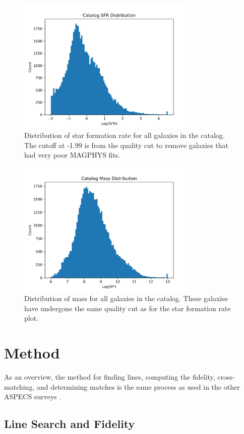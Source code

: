 \begin{figure}[!tbp]
\centering \includegraphics[width=87mm]{Survey/MAGPHYS_SFR.png}
\caption{Distribution of star formation rate for all galaxies in the catalog. The cutoff at -1.99 is from the quality cut to remove galaxies that had very poor MAGPHYS fits.}
\label{fig:MAGPHYS_SFR}
\end{figure}

\begin{figure}[!tbp]
\centering \includegraphics[width=87mm]{Survey/MAGPHYS_Mstar.png}
\caption{Distribution of mass for all galaxies in the catalog. These galaxies have undergone the same quality cut as for the star formation rate plot.}
\label{fig:MAGPHYS_Mstar}
\end{figure}

\section{Method}

As an overview, the method for finding lines, computing the fidelity, cross-matching, and determining matches is the same process as used in the other ASPECS surveys \cite{walter2016alma, decarli2019alma, gonzalez2019alma}.

\subsection{Line Search and Fidelity}

